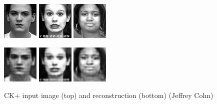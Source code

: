 \documentclass[draft]{article}
\begin{document}
    \begin{figure}[h]
      \centering
      \includegraphics[width=0.2\linewidth]{../graphics/reconstructions/ckplus/input_00.png}
      \includegraphics[width=0.2\linewidth]{../graphics/reconstructions/ckplus/input_01.png}
      \includegraphics[width=0.2\linewidth]{../graphics/reconstructions/ckplus/input_02.png}

      \includegraphics[width=0.2\linewidth]{../graphics/reconstructions/ckplus/reconstruction_00.png}
      \includegraphics[width=0.2\linewidth]{../graphics/reconstructions/ckplus/reconstruction_01.png}
      \includegraphics[width=0.2\linewidth]{../graphics/reconstructions/ckplus/reconstruction_02.png}

      \caption{CK+ input image (top) and reconstruction (bottom) ({\textcopyright}Jeffrey Cohn)}
      \label{fig:ckplus_reconstructions}
    \end{figure}
\end{document}
